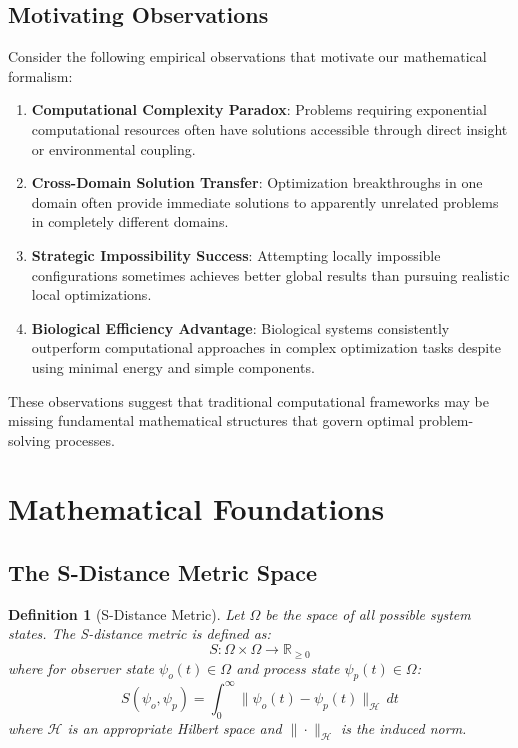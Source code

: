 \documentclass[12pt,a4paper]{article}
\newtheorem{definition}{Definition}
\begin{document}
\subsection{Motivating Observations}

Consider the following empirical observations that motivate our mathematical formalism:

\begin{enumerate}
\item \textbf{Computational Complexity Paradox}: Problems requiring exponential computational resources often have solutions accessible through direct insight or environmental coupling.

\item \textbf{Cross-Domain Solution Transfer}: Optimization breakthroughs in one domain often provide immediate solutions to apparently unrelated problems in completely different domains.

\item \textbf{Strategic Impossibility Success}: Attempting locally impossible configurations sometimes achieves better global results than pursuing realistic local optimizations.

\item \textbf{Biological Efficiency Advantage}: Biological systems consistently outperform computational approaches in complex optimization tasks despite using minimal energy and simple components.
\end{enumerate}

These observations suggest that traditional computational frameworks may be missing fundamental mathematical structures that govern optimal problem-solving processes.

\section{Mathematical Foundations}

\subsection{The S-Distance Metric Space}

\begin{definition}[S-Distance Metric]
Let $\Omega$ be the space of all possible system states. The S-distance metric is defined as:
\begin{equation}
S: \Omega \times \Omega \to \mathbb{R}_{\geq 0}
\end{equation}
where for observer state $\psi_o(t) \in \Omega$ and process state $\psi_p(t) \in \Omega$:
\begin{equation}
S(\psi_o, \psi_p) = \int_0^{\infty} \|\psi_o(t) - \psi_p(t)\|_{\mathcal{H}} \, dt
\end{equation}
where $\mathcal{H}$ is an appropriate Hilbert space and $\|\cdot\|_{\mathcal{H}}$ is the induced norm.
\end{definition}
\end{document}
